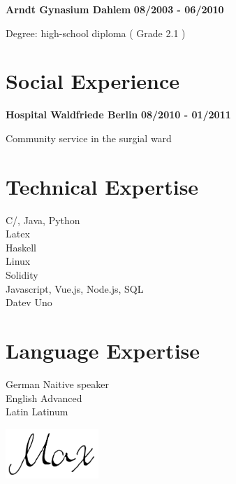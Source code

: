 \documentclass[11pt]{thyv}
\begin{document}
\begin{mdframed}
			\bigskip
			\textbf{Arndt Gynasium Dahlem} 												\hfill \textbf{08/2003 - 06/2010}
			    \begin{outerlist}
			    	\item[] Degree: high-school diploma 								\hfill ( Grade 2.1 )
			    \end{outerlist}

		\section{Social Experience}

			\textbf{Hospital Waldfriede Berlin} 										\hfill \textbf{08/2010 - 01/2011}
			    \begin{outerlist}
			    	\item[] Community service in the surgial ward
			    \end{outerlist}

		\section{Technical Expertise}

			C/\Cplusplus, Java, Python \hfill \ThreeOfFour \\
			Latex \hfill \ThreeOfFour \\
			Haskell \hfill \OneOfFour \\
			Linux \hfill \TwoOfFour \\
			Solidity \hfill \TwoOfFour \\
			Javascript, Vue.js, Node.js, SQL \hfill \TwoOfFour \\
			Datev Uno \hfill \FourOfFour



		\section{Language Expertise}
			German \hfill Naitive speaker \\
			English \hfill Advanced \\
			Latin \hfill Latinum


		\hfill\includegraphics[width=100pt]{signature2.png}
	\end{mdframed}
\end{document}
